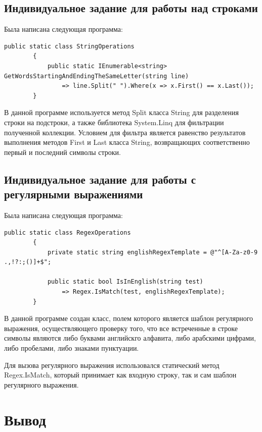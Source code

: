 \documentclass[a4paper,14pt]{extarticle}
\begin{document}
    \subsection{Индивидуальное задание для работы над строками}

    Была написана следующая программа:

    \begin{lstlisting}[language={[Sharp]C}]
        public static class StringOperations
        {
            public static IEnumerable<string> GetWordsStartingAndEndingTheSameLetter(string line)
                => line.Split(" ").Where(x => x.First() == x.Last());
        }
    \end{lstlisting}

    В данной программе используется метод Split класса String для разделения
    строки на подстроки, а также библиотека System.Linq для фильтрации 
    полученной коллекции. Условием для фильтра является равенство результатов
    выполнения методов First и Last класса String, возвращающих соответственно
    первый и последний символы строки.

    \subsection{Индивидуальное задание для работы с регулярными выражениями}

    Была написана следующая программа:

    \begin{lstlisting}[language={[Sharp]C}]
        public static class RegexOperations
        {
            private static string englishRegexTemplate = @"^[A-Za-z0-9 .,!?:;()]+$";

            public static bool IsInEnglish(string test)
                => Regex.IsMatch(test, englishRegexTemplate);
        }
    \end{lstlisting}

    В данной программе создан класс, полем которого является шаблон регулярного
    выражения, осуществляющего проверку того, что все встреченные в строке символы
    являются либо буквами английскго алфавита, либо арабскими цифрами, либо пробелами,
    либо знаками пунктуации. 

    Для вызова регулярного выражения использовался статический метод Regex.IsMatch,
    который принимает как входную строку, так и сам шаблон регулярного выражения.

    \section{Вывод}
\end{document}
